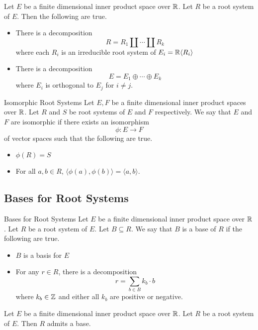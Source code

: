 \documentclass[a4paper]{article}
\begin{document}
\begin{prp}{}{} Let $E$ be a finite dimensional inner product space over $\mathbb{R}$. Let $R$ be a root system of $E$. Then the following are true. 
\begin{itemize}
\item There is a decomposition $$R=R_1\amalg\cdots\amalg R_k$$ where each $R_i$ is an irreducible root system of $E_i=\mathbb{R}\langle R_i\rangle$
\item There is a decomposition $$E=E_1\oplus\cdots\oplus E_k$$ where $E_i$ is orthogonal to $E_j$ for $i\neq j$. 
\end{itemize}
\end{prp}

\begin{defn}{Isomorphic Root Systems}{} Let $E,F$ be a finite dimensional inner product spaces over $\mathbb{R}$. Let $R$ and $S$ be root systems of $E$ and $F$ respectively. We say that $E$ and $F$ are isomorphic if there exists an isomorphism $$\phi:E\to F$$ of vector spaces such that the following are true. 
\begin{itemize}
\item $\phi(R)=S$
\item For all $a,b\in R$, $\langle\phi(a),\phi(b)\rangle=\langle a,b\rangle$. 
\end{itemize}
\end{defn}

\subsection{Bases for Root Systems}
\begin{defn}{Bases for Root Systems}{} Let $E$ be a finite dimensional inner product space over $\mathbb{R}$. Let $R$ be a root system of $E$. Let $B\subseteq R$. We say that $B$ is a base of $R$ if the following are true. 
\begin{itemize}
\item $B$ is a basis for $E$
\item For any $r\in R$, there is a decomposition $$r=\sum_{b\in B}k_b\cdot b$$ where $k_b\in\mathbb{Z}$ and either all $k_b$ are positive or negative. 
\end{itemize}
\end{defn}

\begin{prp}{}{} Let $E$ be a finite dimensional inner product space over $\mathbb{R}$. Let $R$ be a root system of $E$. Then $R$ admits a base. 
\end{prp}
\end{document}
